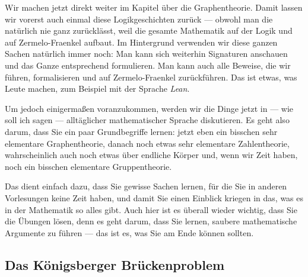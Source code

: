 \begin{spoken-clean}[00:01:25 - 00:03:08]
Wir machen jetzt direkt weiter im Kapitel über die Graphentheorie. Damit lassen wir vorerst auch einmal diese Logikgeschichten zurück --- obwohl man die natürlich nie ganz zurücklässt, weil die gesamte Mathematik auf der Logik und auf Zermelo-Fraenkel aufbaut. Im Hintergrund verwenden wir diese ganzen Sachen natürlich immer noch: Man kann sich weiterhin Signaturen anschauen und das Ganze entsprechend formulieren. Man kann auch alle Beweise, die wir führen, formalisieren und auf Zermelo-Fraenkel zurückführen. Das ist etwas, was Leute machen, zum Beispiel mit der Sprache \emph{Lean}.

Um jedoch einigermaßen voranzukommen, werden wir die Dinge jetzt in --- wie soll ich sagen --- alltäglicher mathematischer Sprache diskutieren. Es geht also darum, dass Sie ein paar Grundbegriffe lernen: jetzt eben ein bisschen sehr elementare Graphentheorie, danach noch etwas sehr elementare Zahlentheorie, wahrscheinlich auch noch etwas über endliche Körper und, wenn wir Zeit haben, noch ein bisschen elementare Gruppentheorie.

Das dient einfach dazu, dass Sie gewisse Sachen lernen, für die Sie in anderen Vorlesungen keine Zeit haben, und damit Sie einen Einblick kriegen in das, was es in der Mathematik so alles gibt. Auch hier ist es überall wieder wichtig, dass Sie die Übungen lösen, denn es geht darum, dass Sie lernen, saubere mathematische Argumente zu führen --- das ist es, was Sie am Ende können sollten.
\end{spoken-clean}

\subsection{Das Königsberger Brückenproblem}

